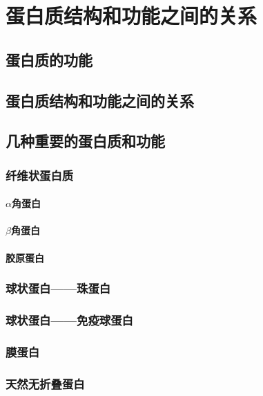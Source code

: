 \section{蛋白质结构和功能之间的关系}

\subsection{蛋白质的功能}

\subsection{蛋白质结构和功能之间的关系}

\subsection{几种重要的蛋白质和功能}

\subsubsection{纤维状蛋白质}

\paragraph{$\alpha$角蛋白}

\paragraph{$\beta$角蛋白}

\paragraph{胶原蛋白}

\subsubsection{球状蛋白——珠蛋白}

\subsubsection{球状蛋白——免疫球蛋白}

\subsubsection{膜蛋白}

\subsubsection{天然无折叠蛋白}


